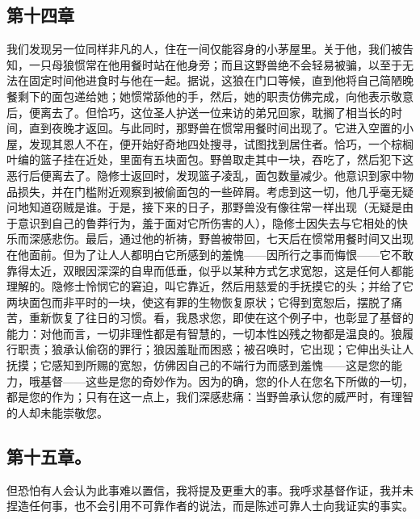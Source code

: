 
\subsection{第十四章}

我们发现另一位同样非凡的人，住在一间仅能容身的小茅屋里。关于他，我们被告知，一只母狼惯常在他用餐时站在他身旁；而且这野兽绝不会轻易被骗，以至于无法在固定时间他进食时与他在一起。据说，这狼在门口等候，直到他将自己简陋晚餐剩下的面包递给她；她惯常舔他的手，然后，她的职责仿佛完成，向他表示敬意后，便离去了。但恰巧，这位圣人护送一位来访的弟兄回家，耽搁了相当长的时间，直到夜晚才返回。与此同时，那野兽在惯常用餐时间出现了。它进入空置的小屋，发现其恩人不在，便开始好奇地四处搜寻，试图找到居住者。恰巧，一个棕榈叶编的篮子挂在近处，里面有五块面包。野兽取走其中一块，吞吃了，然后犯下这恶行后便离去了。隐修士返回时，发现篮子凌乱，面包数量减少。他意识到家中物品损失，并在门槛附近观察到被偷面包的一些碎屑。考虑到这一切，他几乎毫无疑问地知道窃贼是谁。于是，接下来的日子，那野兽没有像往常一样出现（无疑是由于意识到自己的鲁莽行为，羞于面对它所伤害的人），隐修士因失去与它相处的快乐而深感悲伤。最后，通过他的祈祷，野兽被带回，七天后在惯常用餐时间又出现在他面前。但为了让人人都明白它所感到的羞愧——因所行之事而悔恨——它不敢靠得太近，双眼因深深的自卑而低垂，似乎以某种方式乞求宽恕，这是任何人都能理解的。隐修士怜悯它的窘迫，叫它靠近，然后用慈爱的手抚摸它的头；并给了它两块面包而非平时的一块，使这有罪的生物恢复原状；它得到宽恕后，摆脱了痛苦，重新恢复了往日的习惯。看，我恳求您，即使在这个例子中，也彰显了基督的能力：对他而言，一切非理性都是有智慧的，一切本性凶残之物都是温良的。狼履行职责；狼承认偷窃的罪行；狼因羞耻而困惑；被召唤时，它出现；它伸出头让人抚摸；它感知到所赐的宽恕，仿佛因自己的不端行为而感到羞愧——这是您的能力，哦基督——这些是您的奇妙作为。因为的确，您的仆人在您名下所做的一切，都是您的作为；只有在这一点上，我们深感悲痛：当野兽承认您的威严时，有理智的人却未能崇敬您。\par


\subsection{第十五章。}

但恐怕有人会认为此事难以置信，我将提及更重大的事。我呼求基督作证，我并未捏造任何事，也不会引用不可靠作者的说法，而是陈述可靠人士向我证实的事实。\par

